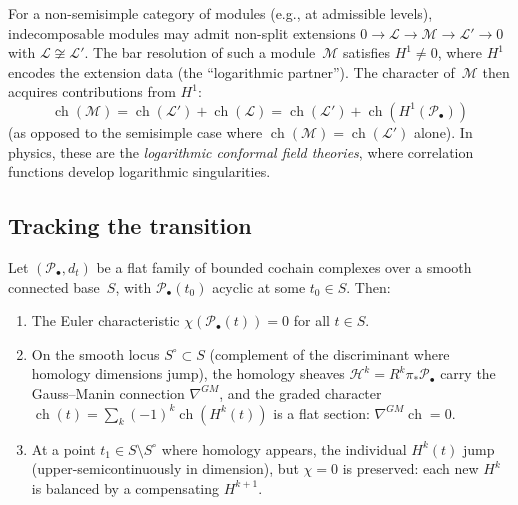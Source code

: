 \begin{example}\label{ex:logarithmic-modules}
For a non-semisimple category of modules (e.g., at admissible levels),
indecomposable modules may admit non-split extensions
$0 \to \mathcal{L} \to \mathcal{M} \to \mathcal{L}' \to 0$
with $\mathcal{L} \not\cong \mathcal{L}'$. The bar resolution of
such a module~$\mathcal{M}$ satisfies $H^1 \neq 0$, where $H^1$
encodes the extension data (the ``logarithmic partner''). The
character of~$\mathcal{M}$ then acquires contributions from $H^1$:
\[
\operatorname{ch}(\mathcal{M})
= \operatorname{ch}(\mathcal{L}') + \operatorname{ch}(\mathcal{L})
= \operatorname{ch}(\mathcal{L}')
 + \operatorname{ch}(H^1(\mathcal{P}_\bullet))
\]
(as opposed to the semisimple case where
$\operatorname{ch}(\mathcal{M}) = \operatorname{ch}(\mathcal{L}')$
alone). In physics, these are the \emph{logarithmic conformal field
theories}, where correlation functions develop logarithmic
singularities.
\end{example}

\subsection{Tracking the transition}

\begin{theorem}
\label{thm:deformation-acyclicity}
Let $(\mathcal{P}_\bullet, d_t)$ be a flat family of bounded cochain
complexes over a smooth connected base~$S$, with $\mathcal{P}_\bullet(t_0)$
acyclic at some $t_0 \in S$. Then:
\begin{enumerate}
\item The Euler characteristic $\chi(\mathcal{P}_\bullet(t)) = 0$ for all
$t \in S$.
\item On the smooth locus $S^{\circ} \subset S$ (complement of the discriminant
where homology dimensions jump), the homology sheaves
$\mathcal{H}^k = R^k\pi_*\mathcal{P}_\bullet$ carry the Gauss--Manin
connection $\nabla^{GM}$, and the graded character
$\operatorname{ch}(t) = \sum_k (-1)^k \operatorname{ch}(H^k(t))$ is a
flat section: $\nabla^{GM}\operatorname{ch} = 0$.
\item At a point $t_1 \in S \setminus S^{\circ}$ where homology appears,
the individual $H^k(t)$ jump (upper-semicontinuously in dimension), but
$\chi = 0$ is preserved: each new $H^k$ is balanced by a compensating $H^{k+1}$.
\end{enumerate}
\end{theorem}

